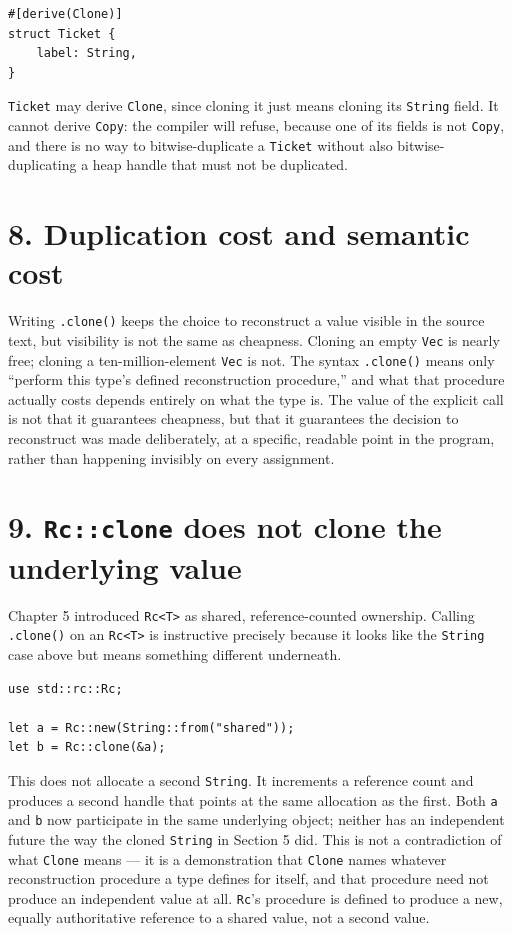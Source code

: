 \documentclass[11pt]{book}
\begin{document}
\begin{lstlisting}
#[derive(Clone)]
struct Ticket {
    label: String,
}
\end{lstlisting}

\texttt{Ticket} may derive \texttt{Clone}, since cloning it just means cloning its \texttt{String} field. It cannot derive \texttt{Copy}: the compiler will refuse, because one of its fields is not \texttt{Copy}, and there is no way to bitwise-duplicate a \texttt{Ticket} without also bitwise-duplicating a heap handle that must not be duplicated.

\section*{8. Duplication cost and semantic cost}

Writing \texttt{.clone()} keeps the choice to reconstruct a value visible in the source text, but visibility is not the same as cheapness. Cloning an empty \texttt{Vec} is nearly free; cloning a ten-million-element \texttt{Vec} is not. The syntax \texttt{.clone()} means only ``perform this type's defined reconstruction procedure,'' and what that procedure actually costs depends entirely on what the type is. The value of the explicit call is not that it guarantees cheapness, but that it guarantees the decision to reconstruct was made deliberately, at a specific, readable point in the program, rather than happening invisibly on every assignment.

\section*{9. \texttt{Rc::clone} does not clone the underlying value}

Chapter 5 introduced \texttt{Rc<T>} as shared, reference-counted ownership. Calling \texttt{.clone()} on an \texttt{Rc<T>} is instructive precisely because it looks like the \texttt{String} case above but means something different underneath.

\begin{lstlisting}
use std::rc::Rc;

let a = Rc::new(String::from("shared"));
let b = Rc::clone(&a);
\end{lstlisting}

This does not allocate a second \texttt{String}. It increments a reference count and produces a second handle that points at the same allocation as the first. Both \texttt{a} and \texttt{b} now participate in the same underlying object; neither has an independent future the way the cloned \texttt{String} in Section 5 did. This is not a contradiction of what \texttt{Clone} means --- it is a demonstration that \texttt{Clone} names whatever reconstruction procedure a type defines for itself, and that procedure need not produce an independent value at all. \texttt{Rc}'s procedure is defined to produce a new, equally authoritative reference to a shared value, not a second value.
\end{document}
